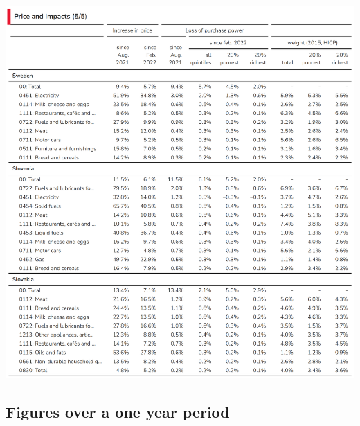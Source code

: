 \documentclass[
  9pt,
  a4paper,
  numbers=noendperiod,
  DIV=12]{scrartcl}
\begin{document}
\includegraphics{../svg/annex_5.png}

\newpage

\hypertarget{figures-over-a-one-year-period}{%
\subsection{Figures over a one year
period}\label{figures-over-a-one-year-period}}
\end{document}
